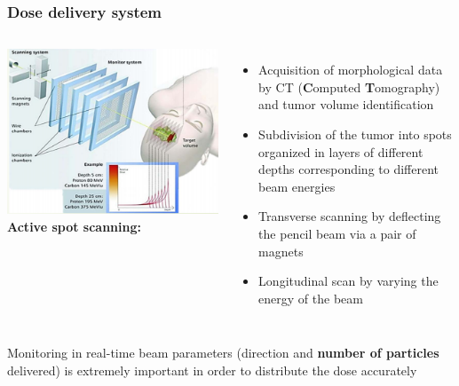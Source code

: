 \documentclass[aspectratio=169]{beamer}
\begin{document}
	\begin{frame}
		\frametitle{Dose delivery system}
		\begin{columns}
			\includegraphics[width=0.95 \textwidth]{IMG/Beam_Monitoring.PNG}
			{\color{blue} \textbf{Active spot scanning:}}
			\begin{itemize}
				\item Acquisition of morphological data by CT (\textbf{C}omputed \textbf{T}omography) and tumor volume identification
				\item Subdivision of the tumor into spots organized in layers of different depths corresponding to different beam energies
				\item Transverse scanning by deflecting the pencil beam via a pair of magnets
				\item Longitudinal scan by varying the energy of the beam
			\end{itemize}
		\end{columns}
	\vspace{0.5 cm}
	{\color{blue} Monitoring in real-time beam parameters (direction and \textbf{number of particles} delivered) \newline is extremely important in order to distribute the dose accurately}
	\end{frame}
\end{document}
